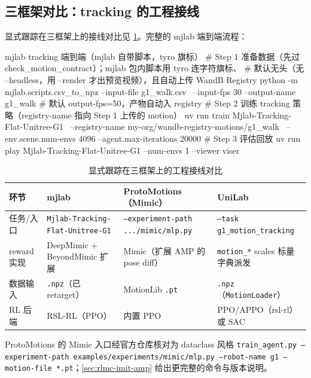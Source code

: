 \subsection{三框架对比：tracking 的工程接线}
\label{sec:rlmc-imit-track-three}

显式跟踪在三框架上的接线对比见 \cref{tab:rlmc-imit-track-fw}。完整的 mjlab 端到端流程：

\begin{codebox}[bash]{mjlab tracking 端到端（mjlab 自带脚本，tyro 旗标）}
# Step 1 准备数据（先过 check_motion_contract）；mjlab 包内脚本用 tyro 连字符旗标、
#   默认无头（无 --headless，用 --render 才出预览视频），且自动上传 WandB Registry
python -m mjlab.scripts.csv_to_npz --input-file g1_walk.csv \
    --input-fps 30 --output-name g1_walk        # 默认 output-fps=50，产物自动入 registry
# Step 2 训练 tracking 策略（registry-name 指向 Step 1 上传的 motion）
uv run train Mjlab-Tracking-Flat-Unitree-G1 \
    --registry-name my-org/wandb-registry-motions/g1_walk \
    --env.scene.num-envs 4096 --agent.max-iterations 20000
# Step 3 评估回放
uv run play Mjlab-Tracking-Flat-Unitree-G1 --num-envs 1 --viewer viser
\end{codebox}

\begin{table}[ht]
\centering
\small
\caption{显式跟踪在三框架上的工程接线对比}
\label{tab:rlmc-imit-track-fw}
\begin{tabular}{@{}llll@{}}
\toprule
环节 & mjlab & ProtoMotions（Mimic） & UniLab \\
\midrule
任务/入口 & \texttt{Mjlab-Tracking-Flat-Unitree-G1} & \texttt{--experiment-path .../mimic/mlp.py} & \texttt{--task g1\_motion\_tracking} \\
reward 实现 & DeepMimic + BeyondMimic 扩展 & Mimic（扩展 AMP 的 pose diff） & \texttt{motion\_*} scales 标量字典派发 \\
数据输入 & \texttt{.npz}（已 retarget） & MotionLib \texttt{.pt} & \texttt{.npz}（\texttt{MotionLoader}） \\
RL 后端 & RSL-RL（PPO） & 内置 PPO & PPO/APPO（rsl-rl）或 SAC \\
\bottomrule
\end{tabular}
\end{table}

ProtoMotions 的 Mimic 入口经官方仓库核对为 dataclass 风格 \texttt{train\_agent.py --experiment-path examples/experiments/mimic/mlp.py --robot-name g1 --motion-file *.pt}；\cref{sec:rlmc-imit-amp} 给出更完整的命令与版本说明。

